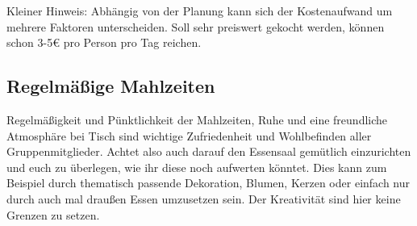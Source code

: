 Kleiner Hinweis: Abhängig von der Planung kann sich der Kostenaufwand um mehrere Faktoren unterscheiden.
Soll sehr preiswert gekocht werden, können schon 3-5€ pro Person pro Tag reichen.

\subsection{Regelmäßige Mahlzeiten}\label{subsec:regelmaige-mahlzeiten}
Regelmäßigkeit und Pünktlichkeit der Mahlzeiten, Ruhe und eine freundliche Atmosphäre bei Tisch sind wichtige Zufriedenheit und Wohlbefinden aller Gruppenmitglieder.
Achtet also auch darauf den Essensaal gemütlich einzurichten und euch zu überlegen, wie ihr diese noch aufwerten könntet.
Dies kann zum Beispiel durch thematisch passende Dekoration, Blumen, Kerzen oder einfach nur durch auch mal draußen Essen umzusetzen sein.
Der Kreativität sind hier keine Grenzen zu setzen.